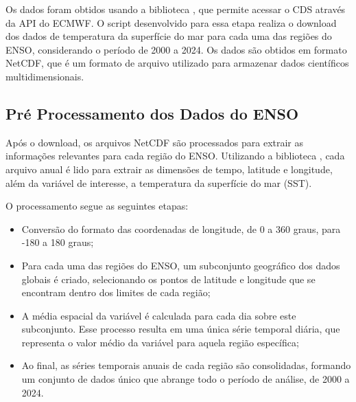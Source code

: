 \begin{table}[htb]
  \centering
\end{table}

Os dados foram obtidos usando a biblioteca , que permite acessar o CDS através da
API do ECMWF. O script desenvolvido para essa etapa realiza o download dos dados de temperatura da superfície do mar
para cada uma das regiões do ENSO, considerando o período de 2000 a 2024. Os dados são obtidos em formato NetCDF, que é 
um formato de arquivo utilizado para armazenar dados científicos multidimensionais.

\subsection{Pré Processamento dos Dados do ENSO} %
Após o download, os arquivos NetCDF são processados para extrair as informações relevantes para cada região do ENSO. 
Utilizando a biblioteca , cada arquivo anual é lido para extrair as dimensões de tempo, latitude e longitude, 
além da variável de interesse, a temperatura da superfície do mar (SST).

O processamento segue as seguintes etapas:
\begin{itemize}
\item Conversão do formato das coordenadas de longitude, de 0 a 360 graus, para -180 a 180 graus;
\item Para cada uma das regiões do ENSO, um subconjunto geográfico dos dados globais é criado, selecionando os pontos
de latitude e longitude que se encontram dentro dos limites de cada região;
\item A média espacial da variável é calculada para cada dia sobre este subconjunto. Esse processo resulta em uma única série
temporal diária, que representa o valor médio da variável para aquela região específica;
\item Ao final, as séries temporais anuais de cada região são consolidadas, formando um conjunto de dados único que abrange
todo o período de análise, de 2000 a 2024.
\end{itemize}

